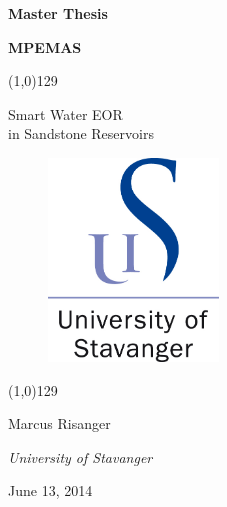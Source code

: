 \begin{titlepage}
\begin{center}
\vspace*{1cm}

{\LARGE{\bfseries  Master Thesis}}

\vspace{0.1cm}
{\LARGE{\bfseries MPEMAS}}

\linethickness{1.2pt}
\color{uisblue}
\line(1,0){129}
\color{black}

{\LARGE
Smart Water EOR 			\\
in Sandstone Reservoirs }



\vspace{1.5cm}

\begin{figure}[h]
\centering
\includegraphics[height=5.4cm]{figures/uislogo}
\end{figure}

\vspace{2cm}



\color{uisblue}
\line(1,0){129}
\color{black}

\vspace{.05cm}


{\large Marcus Risanger }

\vspace{1.3cm}

{\large \textit{University of Stavanger}}

\vspace{0.1cm}


{\large June 13, 2014}

\end{center}
\end{titlepage}
